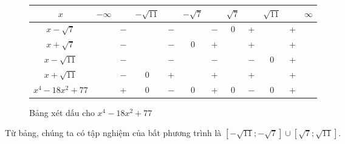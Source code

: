 \begin{figure}[H]
   \centering
   \begin{tabular}{|c|ccccccccccc|}
      \hline
      $x$                   & $-\infty$ &   & $-\sqrt{11}$ &     & $-\sqrt{7}$ &     & $\sqrt{7}$ &     & $\sqrt{11}$ &   & $\infty$ \\
      \hline
      $x-\sqrt{7}$          &           & $-$ &              & $-$ &             & $-$ &     0      &  +  &             & + &           \\
      \hline
      $x+\sqrt{7}$          &           & $-$ &              & $-$ &      0       & $+$ &          &  +  &             & + &           \\
      \hline
      $x-\sqrt{11}$          &           & $-$ &             & $-$ &             & $-$ &            & $-$ &      0      & + &           \\
      \hline
      $x+\sqrt{11}$          &           & $-$ &       0      & $+$ &             & $+$ &            & $+$ &            & + &           \\
      \hline
      $x^4 - 18x^2 + 77$ &           & + &      0       & $-$ &      0      &  +  &     0      & $-$ &      0      & + &           \\
      \hline
      \end{tabular}
   \caption{Bảng xét dấu cho $x^4 - 18x^2 + 77$}
   \label{tab:ham_so_mot_bien:da_thuc:gbpt6}
\end{figure}

Từ bảng, chúng ta có tập nghiệm của bất phương trình là $\left[-\sqrt{11}; -\sqrt{7}\right] \cup \left[\sqrt{7}; \sqrt{11}\right]$.

